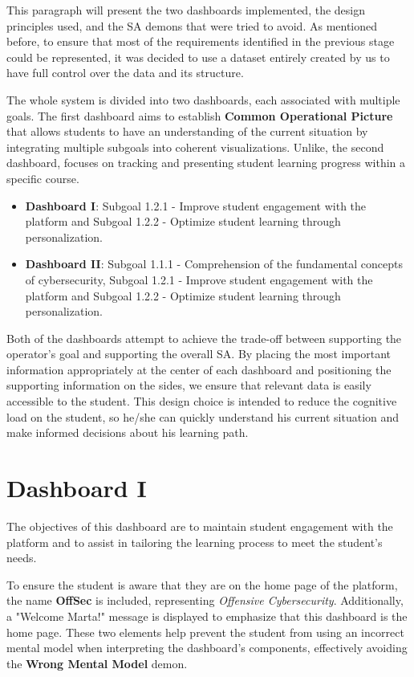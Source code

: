 This paragraph will present the two dashboards implemented, the design principles used, and the SA demons that were tried to avoid. As mentioned before, to ensure that most of the requirements identified in the previous stage could be represented, it was decided to use a dataset entirely created by us to have full control over the data and its structure.

The whole system is divided into two dashboards, each associated with multiple goals. The first dashboard aims to establish \textbf{Common Operational Picture} that allows students to have an understanding of the current situation by integrating multiple subgoals into coherent visualizations. 
Unlike, the second dashboard, focuses on tracking and presenting student learning progress within a specific course.

\begin{itemize}
    \item \textbf{Dashboard I}: Subgoal 1.2.1 - Improve student engagement with the platform and Subgoal 1.2.2 - Optimize student learning through personalization.
    \item \textbf{Dashboard II}: Subgoal 1.1.1 - Comprehension of the fundamental concepts of cybersecurity, Subgoal 1.2.1 - Improve student engagement with the platform and Subgoal 1.2.2 - Optimize student learning through personalization.
\end{itemize} 

Both of the dashboards attempt to achieve the trade-off between supporting the operator's goal and supporting the overall SA. By placing the most important information appropriately at the center of each dashboard and positioning the supporting information on the sides, we ensure that relevant data is easily accessible to the student. This design choice is intended to reduce the cognitive load on the student, so he/she can quickly understand his current situation and make informed decisions about his learning path.


\section{Dashboard I}

The objectives of this dashboard are to maintain student engagement with the platform and to assist in tailoring the learning process to meet the student's needs.

To ensure the student is aware that they are on the home page of the platform, the name \textbf{OffSec} is included, representing \textit{Offensive Cybersecurity}. Additionally, a "Welcome Marta!" message is displayed to emphasize that this dashboard is the home page. These two elements help prevent the student from using an incorrect mental model when interpreting the dashboard's components, effectively avoiding the \textbf{Wrong Mental Model} demon.

